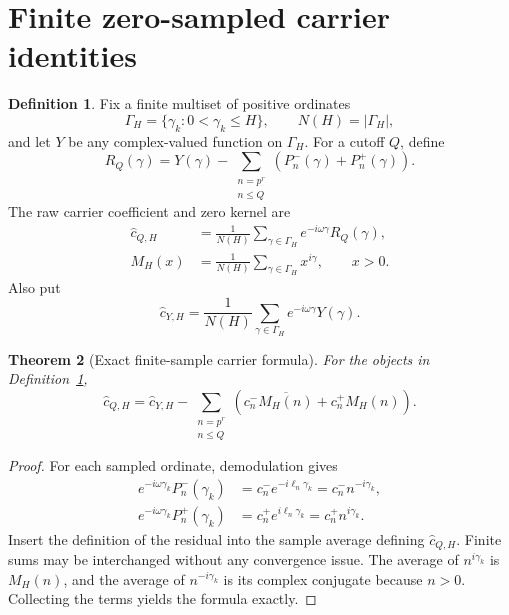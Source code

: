 \documentclass[11pt]{amsart}
\numberwithin{equation}{section}
\theoremstyle{plain}
\newtheorem{theorem}{Theorem}[section]
\theoremstyle{definition}
\newtheorem{definition}[theorem]{Definition}
\theoremstyle{remark}
\newcommand{\1}{\mathbf{1}}
\begin{document}
\section{Finite zero-sampled carrier identities}
\label{sec:exact_area_defect}

\begin{definition}
\label{def:abstract_sampled_model}
Fix a finite multiset of positive ordinates
\begin{equation}
\Gamma_H=\{\gamma_k:0<\gamma_k\leq H\},
\qquad N(H)=|\Gamma_H|,
\label{eq:abstract_GammaH}
\end{equation}
and let $Y$ be any complex-valued function on $\Gamma_H$.  For a cutoff
$Q$, define
\begin{equation}
R_Q(\gamma)
=
Y(\gamma)-
\sum_{\substack{n=p^r\\n\leq Q}}
\left(P_n^-(\gamma)+P_n^+(\gamma)\right).
\label{eq:abstract_RQ}
\end{equation}
The raw carrier coefficient and zero kernel are
\begin{align}
\widehat c_{Q,H}
&=
\frac1{N(H)}\sum_{\gamma\in\Gamma_H}
e^{-i\omega\gamma}R_Q(\gamma),
\label{eq:abstract_raw_carrier}
\\
M_H(x)
&=
\frac1{N(H)}\sum_{\gamma\in\Gamma_H}x^{i\gamma},
\qquad x>0.
\label{eq:abstract_MH}
\end{align}
Also put
\begin{equation}
\widehat c_{Y,H}
=
\frac1{N(H)}\sum_{\gamma\in\Gamma_H}
e^{-i\omega\gamma}Y(\gamma).
\label{eq:abstract_cYH}
\end{equation}
\end{definition}

\begin{theorem}[Exact finite-sample carrier formula]
\label{thm:abstract_carrier_formula}
For the objects in Definition~\ref{def:abstract_sampled_model},
\begin{equation}
\boxed{
\widehat c_{Q,H}
=
\widehat c_{Y,H}
-
\sum_{\substack{n=p^r\\n\leq Q}}
\left(c_n^-\overline{M_H(n)}+c_n^+M_H(n)\right).
}
\label{eq:abstract_carrier_formula}
\end{equation}
\end{theorem}

\begin{proof}
For each sampled ordinate, demodulation gives
\begin{align}
e^{-i\omega\gamma_k}P_n^-(\gamma_k)
&=
c_n^-e^{-i\ell_n\gamma_k}
=
c_n^-n^{-i\gamma_k},
\label{eq:abstract_carrier_minus_proof}
\\
e^{-i\omega\gamma_k}P_n^+(\gamma_k)
&=
c_n^+e^{i\ell_n\gamma_k}
=
c_n^+n^{i\gamma_k}.
\label{eq:abstract_carrier_plus_proof}
\end{align}
Insert the definition of the residual into the sample average defining
\(\widehat c_{Q,H}\).  Finite sums may be interchanged without any
convergence issue.  The average of \(n^{i\gamma_k}\) is \(M_H(n)\), and
the average of \(n^{-i\gamma_k}\) is its complex conjugate because
\(n>0\).  Collecting the terms yields the formula exactly.
\end{proof}
\end{document}
